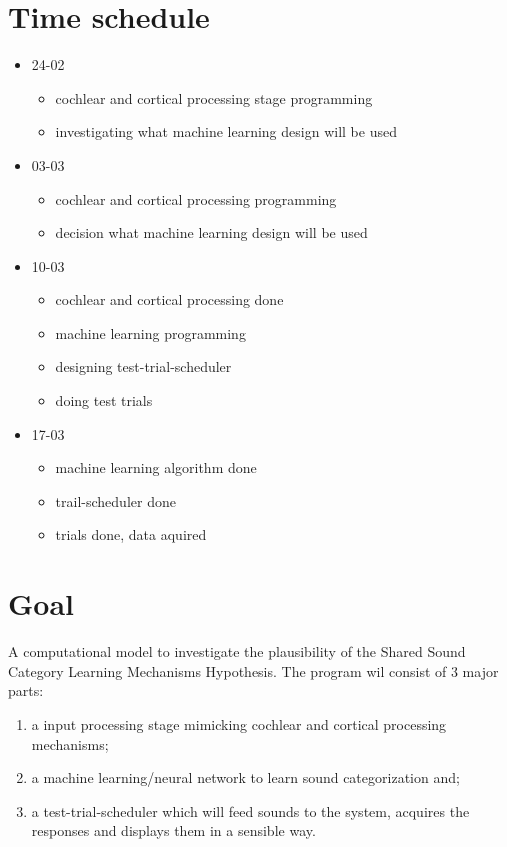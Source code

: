 \documentclass{article}
\begin{document}
\section{Time schedule}
\begin{itemize}
	\item 24-02 
	\begin{itemize}
		\item cochlear and cortical processing stage programming
		\item investigating what machine learning design will be used
	\end{itemize}
	\item 03-03 
	\begin{itemize}
		\item cochlear and cortical processing programming
		\item decision  what machine learning design will be used
	\end{itemize}
	\item 10-03
	\begin{itemize}
		\item cochlear and cortical processing done
		\item machine learning programming
		\item designing test-trial-scheduler
		\item doing test trials
	\end{itemize}
	\item 17-03
	\begin{itemize}
		\item machine learning algorithm done
		\item trail-scheduler done
		\item trials done, data aquired
	\end{itemize}
\end{itemize}

\section{Goal}
A computational model to investigate the plausibility of  the Shared Sound Category Learning Mechanisms Hypothesis. The program wil consist of 3 major parts: 
\begin{enumerate}
	\item a input processing stage mimicking cochlear and cortical processing mechanisms; 
	\item a machine learning/neural network to learn sound categorization and; 
	\item a test-trial-scheduler which will feed sounds to the system, acquires the responses and displays them in a sensible way.
\end{enumerate}
\end{document}
